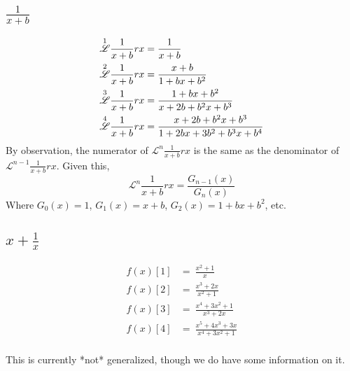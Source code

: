 \documentclass[12pt, letterpaper]{article}
\begin{document}
\subsection{$\frac{1}{x+b}$}
\begin{equation}
    \begin{split}
        \overset{1}{\mathscr{L}} \frac{1}{x+b} rx & = \frac{1}{x+b}\\
        \overset{2}{\mathscr{L}} \frac{1}{x+b} rx & = \frac{x+b}{1+bx+b^2}\\
        \overset{3}{\mathscr{L}} \frac{1}{x+b} rx & = \frac{1+bx+b^2}{x+2b+b^2x+b^3}\\
        \overset{4}{\mathscr{L}} \frac{1}{x+b} rx & = \frac{x+2b+b^2x+b^3}{1+2bx+3b^2+b^3x+b^4}\\
    \end{split}
\end{equation}
By observation, the numerator of $\mathscr{L}^n \frac{1}{x+b} rx$ is the same as the denominator of $\mathscr{L}^{n-1} \frac{1}{x+b} rx$. Given this,
$$\mathscr{L}^{n} \frac{1}{x+b} rx = \frac{G_{n-1}(x)}{G_n(x)}$$
Where $G_0(x) = 1$, $G_1(x) = {x+b}$, $G_2(x) = 1+bx+b^2$, etc.

\subsection{$x + \frac{1}{x}$}
\begin{equation}
    \begin{split}
        f(x)[1] & = \  \frac{x^2+1}{x}\\
        f(x)[2] & = \  \frac{x^3+2x}{x^2+1}\\
        f(x)[3] & = \  \frac{x^4+3x^2+1}{x^3+2x}\\
        f(x)[4] & = \ \frac{x^5+4x^3+3x}{x^4+3x^2+1}\\
    \end{split}
\end{equation}

This is currently *not* generalized, though we do have some information on it.
\end{document}
